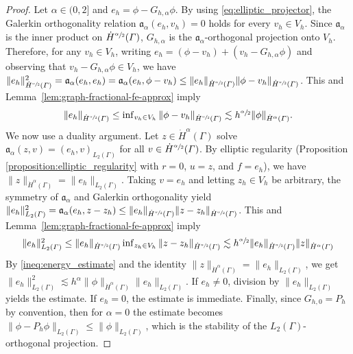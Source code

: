 \documentclass[numbers,webpdf]{ima-authoring-template}%
\theoremstyle{thmstyletwo}%
\numberwithin{equation}{section}
\begin{document}
\begin{proof}
    Let $\alpha\in(0,2]$ and $e_h=\phi-G_{h,\alpha}\phi$. By using \eqref{eq:elliptic_projector}, the Galerkin orthogonality relation $\mathfrak{a}_{\alpha}(e_h,v_h)=0$ holds for every $v_h\in V_h$. Since $\mathfrak{a}_{\alpha}$ is the inner product on $\dot H^{\sfrac{\alpha}{2}}({\mit\varGamma})$, $G_{h,\alpha}$ is the $\mathfrak{a}_{\alpha}$-orthogonal projection onto $V_h$. Therefore, for any $v_h\in V_h$, writing $e_h=(\phi-v_h)+(v_h-G_{h,\alpha}\phi)$ and observing that $v_h-G_{h,\alpha}\phi\in V_h$, we have $\|e_h\|_{\dot H^{\sfrac{\alpha}{2}}({\mit\varGamma})}^2 =\mathfrak{a}_{\alpha}(e_h,e_h) =\mathfrak{a}_{\alpha}(e_h,\phi-v_h) \leq \|e_h\|_{\dot H^{\sfrac{\alpha}{2}}({\mit\varGamma})} \|\phi-v_h\|_{\dot H^{\sfrac{\alpha}{2}}({\mit\varGamma})}$. This and Lemma~\ref{lem:graph-fractional-fe-approx} imply
    \begin{align}
    \label{ineq:energy_estimate}
    \textstyle
        \|e_h\|_{\dot H^{\sfrac{\alpha}{2}}({\mit\varGamma})}\leq\inf_{v_h\in V_h}\|\phi-v_h\|_{\dot H^{\sfrac{\alpha}{2}}({\mit\varGamma})}\lesssim h^{\sfrac{\alpha}{2}}\|\phi\|_{\dot H^\alpha({\mit\varGamma})}.
    \end{align}
    We now use a duality argument. Let $z\in\dot H^\alpha(\Gamma)$ solve $\mathfrak{a}_{\alpha}(z,v)=(e_h,v)_{L_2(\Gamma)}$ for all $v\in \dot H^{\sfrac{\alpha}{2}}({\mit\varGamma})$. By elliptic regularity (Proposition \ref{proposition:elliptic_regularity} with $r=0$, $u = z$, and $f=e_h$), we have $\|z\|_{\dot H^\alpha(\Gamma)} = \|e_h\|_{L_2(\Gamma)}$. Taking $v=e_h$ and letting $z_h\in V_h$ be arbitrary, the symmetry of $\mathfrak{a}_{\alpha}$ and Galerkin orthogonality yield $\|e_h\|_{L_2({\mit\varGamma})}^2 = \mathfrak{a}_{\alpha}(e_h,z-z_h)\leq\|e_h\|_{\dot H^{\sfrac{\alpha}{2}}({\mit\varGamma})}\|z-z_h\|_{\dot H^{\sfrac{\alpha}{2}}({\mit\varGamma})}$. This and Lemma~\ref{lem:graph-fractional-fe-approx} imply
    \begin{align*}
    \textstyle
        \|e_h\|_{L_2({\mit\varGamma})}^2 \leq \|e_h\|_{\dot H^{\sfrac{\alpha}{2}}({\mit\varGamma})} \inf_{z_h\in V_h}\|z-z_h\|_{\dot H^{\sfrac{\alpha}{2}}({\mit\varGamma})} \lesssim h^{\sfrac{\alpha}{2}} \|e_h\|_{\dot H^{\sfrac{\alpha}{2}}({\mit\varGamma})} \|z\|_{\dot H^\alpha({\mit\varGamma})} 
    \end{align*}
    By \eqref{ineq:energy_estimate} and the identity $\|z\|_{\dot H^\alpha(\Gamma)} = \|e_h\|_{L_2(\Gamma)}$, we get $\|e_h\|_{L_2(\Gamma)}^2\lesssim h^\alpha \|\phi\|_{\dot H^\alpha(\Gamma)}\|e_h\|_{L_2(\Gamma)}$. If $e_h\neq0$, division by $\|e_h\|_{L_2(\Gamma)}$ yields the estimate. If $e_h=0$, the estimate is immediate. Finally, since $G_{h,0}=P_h$ by convention, then for $\alpha=0$ the
estimate becomes $\|\phi-P_h\phi\|_{L_2(\Gamma)}\leq\|\phi\|_{L_2(\Gamma)}$, which is the stability of the $L_2(\Gamma)$-orthogonal projection.
\hfill
\end{proof}
\end{document}
